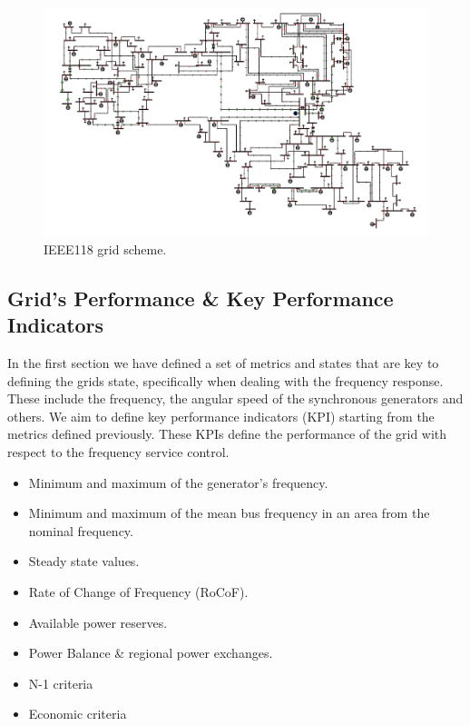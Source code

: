 \documentclass{article}
\begin{document}
\begin{figure}[h!]
    \centering
    \includegraphics[width=1\textwidth]{pictures/IEEE118.png}
    \caption{IEEE118 grid scheme. \cite{grids:ieee118}}
    \label{fig:kundur}
\end{figure}

\subsection{Grid's Performance \& Key Performance Indicators}

In the first section we have defined a set of metrics and states that are key to defining the grids state, specifically when dealing with the frequency response. These include the frequency, the angular speed of the synchronous generators and others. We aim to define key performance indicators (KPI) starting from the metrics defined previously. These KPIs define the performance of the grid with respect to the frequency service control. 

\begin{itemize}
    \item Minimum and maximum of the generator's frequency.
    \item Minimum and maximum of the mean bus frequency in an area from the nominal frequency.
    \item Steady state values.
    \item Rate of Change of Frequency (RoCoF).
    \item Available power reserves.
    \item Power Balance \& regional power exchanges.
    \item N-1 criteria
    \item Economic criteria
\end{itemize}
\end{document}
